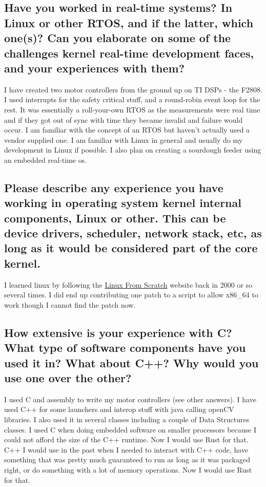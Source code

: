 \documentclass[letter,12pt]{article}
\begin{document}
\subsection{Have you worked in real-time systems? In Linux or other RTOS, and if the latter, which one(s)? Can you elaborate on some of the challenges kernel real-time development faces, and your experiences with them?}
I have created two motor controllers from the ground up on TI DSPs - the F2808. I used interrupts for the safety critical stuff, and a round-robin event loop for the rest. It was essentially a roll-your-own RTOS as the measurements were real time and if they got out of sync with time they became invalid and failure would occur. I am familiar with the concept of an RTOS but haven't actually used a vendor supplied one. I am familiar with Linux in general and usually do my development in Linux if possible. I also plan on creating a sourdough feeder using an embedded real-time os.

\subsection{Please describe any experience you have working in operating system kernel internal components, Linux or other.  This can be device drivers, scheduler, network stack, etc, as long as it would be considered part of the core kernel.}
I learned linux by following the \href{http://linuxfromscratch.org}{Linux From Scratch} website back in 2000 or so several times. I did end up contributing one patch to a script to allow x86\_64 to work though I cannot find the patch now.

\subsection{How extensive is your experience with C? What type of software components have you used it in? What about C++? Why would you use one over the other?}
I used C and assembly to write my motor controllers (see other answers). I have used C++ for some launchers and interop stuff with java calling openCV libraries. I also used it in several classes including a couple of Data Structures classes. I used C when doing embedded software on smaller processors because I could not afford the size of the C++ runtime. Now I would use Rust for that. C++ I would use in the past when I needed to interact with C++ code, have something that was pretty much guaranteed to run as long as it was packaged right, or do something with a lot of memory operations. Now I would use Rust for that.
\end{document}

